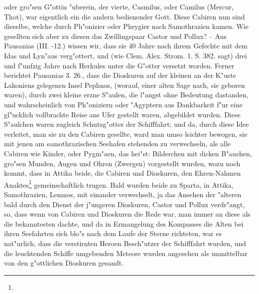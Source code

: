 \documentclass[a4paper, 11pt, oneside, polutonikogreek, german]{article}
\begin{document}
oder gro"sen G"ottin "uberein, der vierte, Casmilus, oder Camilus (Mercur, Thot), war eigentlich ein die andern bedienender Gott. Diese Cabiren nun sind dieselbe, welche durch Ph"onizier oder Phrygier nach Samothrazien kamen. Wie gesellten sich aber zu diesen das Zwillingspaar Castor und Pollux? -- Aus Pausanias (III. -12.) wissen wir, dass sie 40 Jahre nach ihrem Gefechte mit dem Idas und Lyn"aus verg"ottert, und (wie Clem. Alex. Strom. 1. S. 382. sagt) drei und f"unfzig Jahre nach Herkules unter die G"otter versetzt worden. Ferner berichtet Pausanias 3. 26., dass die Dioskuren auf der kleinen an der K"uste Lakoniens gelegenen Insel Pephnos, (worauf, einer alten Sage nach, sie geboren waren), durch zwei kleine erzne S"aulen, die l"angst ohne Bedeutung dastanden, und wahrscheinlich von Ph"oniziern oder "Agyptern aus Dankbarkeit f"ur eine gl"ucklich vollbrachte Reise ans Ufer gestellt waren, abgebildet wurden. Diese S"aulchen waren zugleich Schutzg"otter der Schifffahrt; und da, durch diese Idee verleitet, man sie zu den Cabiren gesellte, ward man umso leichter bewogen, sie mit jenen am samothrazischen Seehafen stehenden zu verwechseln, als alle Cabiren wie Kinder, oder Pygm"aen, das hei"st: Bilderchen mit dicken B"auchen, gro"sen Munden, Augen und Ohren (Zwergen) vorgestellt wurden, wozu noch kommt, dass in Attika beide, die Cabiren und Dioskuren, den Ehren-Nahmen Anaktes\footnote{} gemeinschaftlich trugen. Bald wurden beide zu Sparta, in Attika, Samothrazien, Lemnos, mit einander verwechselt, ja das Ansehen der "alteren bald durch den Dienst der j"ungeren Dioskuren, Castor und Pollux verdr"angt, so, dass wenn von Cabiren und Dioskuren die Rede war, man immer an diese als die bekanntesten dachte, und da in Ermangelung des Kompasses die Alten bei ihren Seefahrten sich blo"s nach dem Laufe der Sterne richteten, war es nat"urlich, dass die verstirnten Heroen Besch"utzer der Schifffahrt wurden, und die leuchtenden Schiffe umgebenden Meteore wurden angesehen als unmittelbar von den g"ottlichen Dioskuren gesandt.
\end{document}
